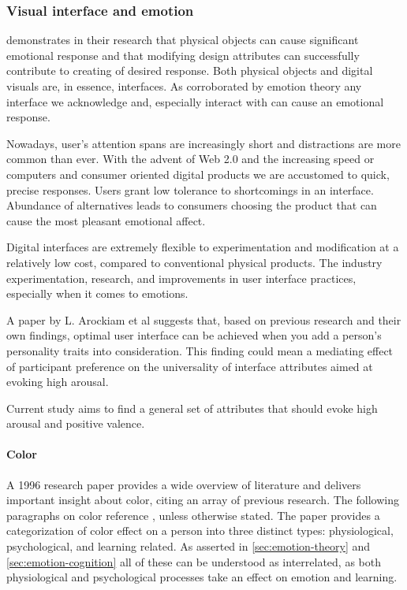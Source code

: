 		
		\subsubsection{Visual interface and emotion}
		
		\cite{Desmet2007} demonstrates in their research that physical objects can cause significant emotional response and that modifying design attributes can successfully contribute to creating of desired response.
		Both physical objects and digital visuals are, in essence, interfaces. As corroborated by emotion theory any interface we acknowledge and, especially interact with can cause an emotional response. 
		
		Nowadays, user's attention spans are increasingly short and distractions are more common than ever. With the advent of Web 2.0 and the increasing speed or computers and consumer oriented digital products we are accustomed to quick, precise responses. Users grant low tolerance to shortcomings in an interface. Abundance of alternatives leads to consumers choosing the product that can cause the most pleasant emotional affect.
		
 		Digital interfaces are extremely flexible to experimentation and modification at a relatively low cost, compared to conventional physical products.
 		The industry  experimentation, research, and improvements in user interface practices, especially when it comes to emotions.
		
		
		
		A paper by L. Arockiam et al \cite{Arockiam2013} suggests that, based on previous research and their own findings, optimal user interface can be achieved when you add a person's personality traits into consideration. This finding could mean a mediating effect of participant preference on the universality of interface attributes aimed at evoking high arousal. 
		
		Current study aims to find a general set of attributes that should evoke high arousal and positive valence.
		
		\paragraph{Color}
		
		A 1996 research paper \cite{Pert1996} provides a wide overview of literature and delivers important insight about color, citing an array of previous research. The following paragraphs on color reference \cite{Pert1996}, unless otherwise stated. The paper provides a categorization of color effect on a person into three distinct types: physiological, psychological, and learning related. As asserted in \ref{sec:emotion-theory} and \ref{sec:emotion-cognition} all of these can be understood as interrelated, as both physiological and psychological processes take an effect on emotion and learning.
						
